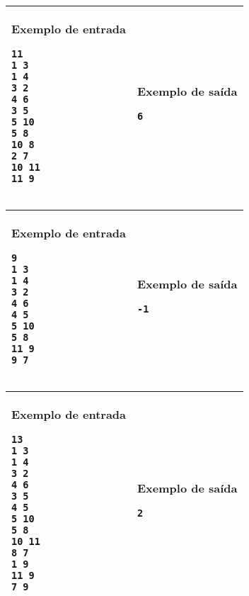 \begin{table}[!h]
\centering
\begin{tabular}{|l|l|}
\hline
\begin{minipage}[t]{3in}
\textbf{Exemplo de entrada}
\begin{verbatim}
11
1 3
1 4
3 2
4 6
3 5
5 10
5 8
10 8
2 7
10 11
11 9
\end{verbatim}
\vspace{1mm}
\end{minipage}
&
\begin{minipage}[t]{3in}
\textbf{Exemplo de saída}
\begin{verbatim}
6
\end{verbatim}
\vspace{1mm}
\end{minipage} \\
\hline
\end{tabular}
\end{table}

\begin{table}[!h]
\centering
\begin{tabular}{|l|l|}
\hline
\begin{minipage}[t]{3in}
\textbf{Exemplo de entrada}
\begin{verbatim}
9
1 3
1 4
3 2
4 6
4 5
5 10
5 8
11 9
9 7
\end{verbatim}
\vspace{1mm}
\end{minipage}
&
\begin{minipage}[t]{3in}
\textbf{Exemplo de saída}
\begin{verbatim}
-1
\end{verbatim}
\vspace{1mm}
\end{minipage} \\
\hline
\end{tabular}
\end{table}

\begin{table}[!h]
\centering
\begin{tabular}{|l|l|}
\hline
\begin{minipage}[t]{3in}
\textbf{Exemplo de entrada}
\begin{verbatim}
13
1 3
1 4
3 2
4 6
3 5
4 5
5 10
5 8
10 11
8 7
1 9
11 9
7 9
\end{verbatim}
\vspace{1mm}
\end{minipage}
&
\begin{minipage}[t]{3in}
\textbf{Exemplo de saída}
\begin{verbatim}
2
\end{verbatim}
\vspace{1mm}
\end{minipage} \\
\hline
\end{tabular}
\end{table}
